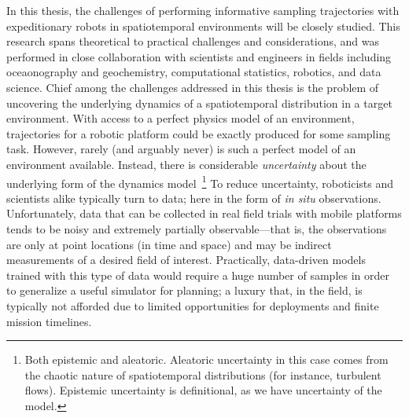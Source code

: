 In this thesis, the challenges of performing informative sampling trajectories with expeditionary robots in spatiotemporal environments will be closely studied. 
This research spans theoretical to practical challenges and considerations, and was performed in close collaboration with scientists and engineers in fields including oceaonography and geochemistry, computational statistics, robotics, and data science.
Chief among the challenges addressed in this thesis is the problem of uncovering the underlying dynamics of a spatiotemporal distribution in a target environment.
With access to a perfect physics model of an environment, trajectories for a robotic platform could be exactly produced for some sampling task.
However, rarely (and arguably never) is such a perfect model of an environment available.
Instead, there is considerable \emph{uncertainty} about the underlying form of the dynamics model~\footnote{Both epistemic and aleatoric. Aleatoric uncertainty in this case comes from the chaotic nature of spatiotemporal distributions (for instance, turbulent flows). Epistemic uncertainty is definitional, as we have uncertainty of the model.}
To reduce uncertainty, roboticists and scientists alike typically turn to data; here in the form of \emph{in situ} observations.
Unfortunately, data that can be collected in real field trials with mobile platforms tends to be noisy and extremely partially observable---that is, the observations are only at point locations (in time and space) and may be indirect measurements of a desired field of interest. 
Practically, data-driven models trained with this type of data would require a huge number of samples in order to generalize a useful simulator for planning; a luxury that, in the field, is typically not afforded due to limited opportunities for deployments and finite mission timelines.

